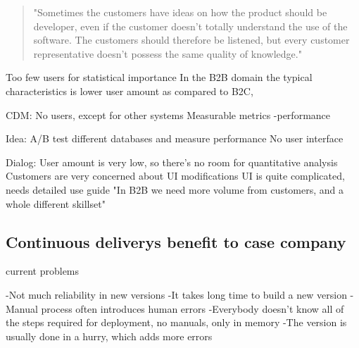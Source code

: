 \documentclass[english]{tktltiki2}
\theoremstyle{definition}
\theoremstyle{remark}
\begin{document}
\begin{quote}
"Sometimes the customers have ideas on how the product should be developer, even if the customer doesn't totally understand the use of the software. The customers should therefore be listened, but every customer representative doesn't possess the same quality of knowledge." 
\end{quote}


Too few users for statistical importance
In the B2B domain the typical characteristics is lower user amount as compared to B2C, 




CDM: 
No users, except for other systems
Measurable metrics
-performance

Idea: A/B test different databases and measure performance
No user interface

Dialog:
User amount is very low, so there's no room for quantitative analysis
Customers are very concerned about UI modifications
UI is quite complicated, needs detailed use guide
"In B2B we need more volume from customers, and a whole different skillset"


\subsection{Continuous deliverys benefit to case company}

current problems 

-Not much reliability in new versions
-It takes long time to build a new version
-Manual process often introduces human errors
-Everybody doesn't know all of the steps required for deployment, no manuals, only in memory
-The version is usually done in a hurry, which adds more errors
\end{document}
